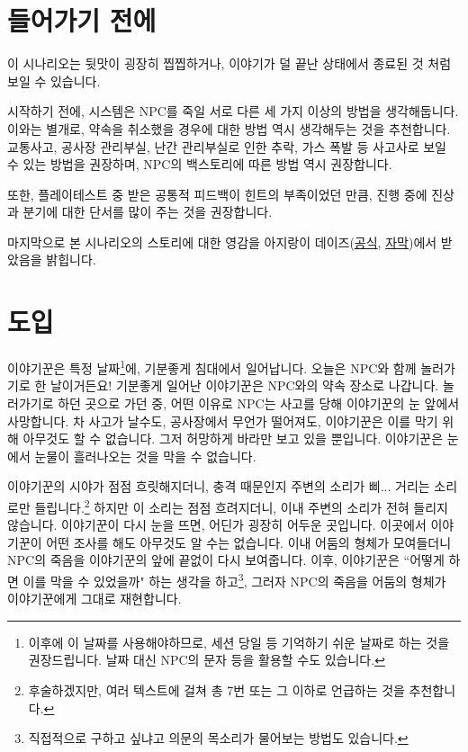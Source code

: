 \documentclass{report}
\begin{document}
	\section{들어가기 전에}
		이 시나리오는 뒷맛이 굉장히 찝찝하거나, 이야기가 덜 끝난 상태에서 종료된 것 처럼 보일 수 있습니다.
		
		시작하기 전에, 시스템은 NPC를 죽일 서로 다른 세 가지 이상의 방법을 생각해둡니다. 이와는 별개로, 약속을 취소했을 경우에 대한 방법 역시 생각해두는 것을 추천합니다. 교통사고, 공사장 관리부실, 난간 관리부실로 인한 추락, 가스 폭발 등 사고사로 보일 수 있는 방법을 권장하며, NPC의 백스토리에 따른 방법 역시 권장합니다.
		
		또한, 플레이테스트 중 받은 공통적 피드백이 힌트의 부족이었던 만큼, 진행 중에 진상과 분기에 대한 단서를 많이 주는 것을 권장합니다.
		
		마지막으로 본 시나리오의 스토리에 대한 영감을 아지랑이 데이즈(\href{https://youtu.be/EMGyiiTC7sg}{공식}, \href{https://youtu.be/VNTgXbCVSUc}{자막})에서 받았음을 밝힙니다.
		
	\section{도입}
		이야기꾼은 특정 날짜\footnote{이후에 이 날짜를 사용해야하므로, 세션 당일 등 기억하기 쉬운 날짜로 하는 것을 권장드립니다. 날짜 대신 NPC의 문자 등을 활용할 수도 있습니다.}에, 기분좋게 침대에서 일어납니다. 오늘은 NPC와 함께 놀러가기로 한 날이거든요! 기분좋게 일어난 이야기꾼은 NPC와의 약속 장소로 나갑니다. 놀러가기로 하던 곳으로 가던 중, 어떤 이유로 NPC는 사고를 당해 이야기꾼의 눈 앞에서 사망합니다. 차 사고가 날수도, 공사장에서 무언가 떨어져도, 이야기꾼은 이를 막기 위해 아무것도 할 수 없습니다. 그저 허망하게 바라만 보고 있을 뿐입니다. 이야기꾼은 눈에서 눈물이 흘러나오는 것을 막을 수 없습니다.
		
		이야기꾼의 시야가 점점 흐릿해지더니, 충격 때문인지 주변의 소리가 삐... 거리는 소리로만 들립니다.\footnote{후술하겠지만, 여러 텍스트에 걸쳐 총 7번 또는 그 이하로 언급하는 것을 추천합니다.} 하지만 이 소리는 점점 흐려지더니, 이내 주변의 소리가 전혀 들리지 않습니다. 이야기꾼이 다시 눈을 뜨면, 어딘가 굉장히 어두운 곳입니다. 이곳에서 이야기꾼이 어떤 조사를 해도 아무것도 알 수는 없습니다. 이내 어둠의 형체가 모여들더니 NPC의 죽음을 이야기꾼의 앞에 끝없이 다시 보여줍니다. 이후, 이야기꾼은 ``어떻게 하면 이를 막을 수 있었을까" 하는 생각을 하고\footnote{직접적으로 구하고 싶냐고 의문의 목소리가 물어보는 방법도 있습니다.}, 그러자 NPC의 죽음을 어둠의 형체가 이야기꾼에게 그대로 재현합니다.
		
\end{document}
